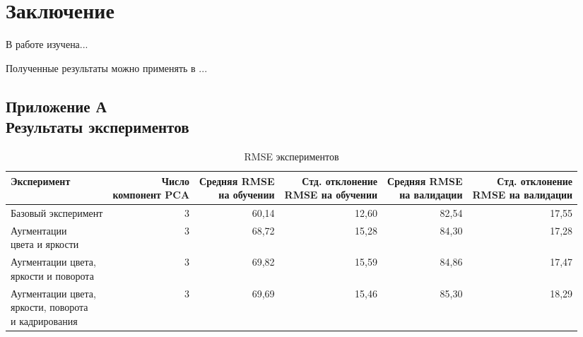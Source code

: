 \documentclass[a4paper,14pt]{article}
\begin{document}
    \newpage


    \section{Заключение}

    В работе изучена...
    
    Полученные результаты можно применять в ...

    \newpage
    \renewcommand{\refname}{{\normalsize \hfill Список использованных источников \hfill}}
%    
    
    
    \newpage

    \begin{landscape}

        \begin{flushright}
            \section*{\normalsize \hfill Приложение А \\ \hfill Результаты экспериментов}
        \end{flushright}

        \begin{table}[H]
            \centering
            \caption{RMSE экспериментов}
            \label{tab:experiments_kpoints_rmse}
            \begin{tabular}{lrrrrr}
                \toprule
                Эксперимент & \makecell{Число \\ компонент PCA } & \makecell{Средняя RMSE \\ на обучении} & \makecell{Стд. отклонение \\ RMSE на обучении} & \makecell{Средняя RMSE \\ на валидации} & \makecell{Стд. отклонение \\ RMSE на валидации} \\
                \midrule
                Базовый эксперимент & 3 & 60,14 & 12,60 & 82,54 & 17,55 \\ \hline
                \makecell{Аугментации \\ цвета и яркости} & 3 & 68,72 & 15,28 & 84,30 & 17,28 \\ \hline
                \makecell{Аугментации цвета,\\ яркости и поворота} & 3 & 69,82 & 15,59 & 84,86 & 17,47 \\ \hline
                \makecell{Аугментации цвета,\\ яркости, поворота \\ и кадрирования} & 3 & 69,69 & 15,46 & 85,30 & 18,29 \\
                \bottomrule
            \end{tabular}
        \end{table}


\end{landscape}
\end{document}
